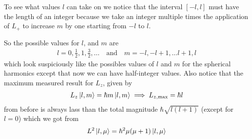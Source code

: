 To see what values $l$ can take on we notice that the interval $[-l,l]$ must have the length of an integer because we take an integer multiple times the application of $L_{+}$ to increase $m$ by one starting from $-l$ to $l$.

So the possible values for $l$, and $m$ are
\begin{align*}
  l = 0, \tfrac{1}{2}, 1, \tfrac{3}{2}, \ldots \quad \text{and} \quad m = -l, -l+1, \ldots l+1,l
\end{align*}
which look suspiciously like the possibles values of $l$ and $m$ for the spherical harmonics except that now we can have half-integer values.
Also notice that the maximum measured result for $L_z$, given by
\begin{align*}
  L_z \ket{l,m} = \hbar m \ket{l,m} \implies L_{z,\max} = \hbar l
\end{align*}
from before is always lass than the total magnitude $\hbar\sqrt{l(l+1)}$ (except for $l = 0$) which we got from
\begin{align*}
  L^{2}\ket{l,\mu} = \hbar^{2} \mu(\mu+1) \ket{l,\mu}
\end{align*}

